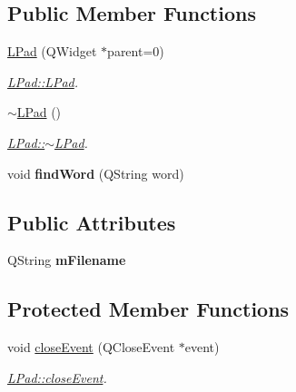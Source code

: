 \subsection*{Public Member Functions}
\begin{DoxyCompactItemize}
\item 
\hyperlink{class_l_pad_ae4d17da9ca09a5c0dbcebc20f1d981c9}{L\+Pad} (Q\+Widget $\ast$parent=0)
\begin{DoxyCompactList}\small\item\em \hyperlink{class_l_pad_ae4d17da9ca09a5c0dbcebc20f1d981c9}{L\+Pad\+::\+L\+Pad}. \end{DoxyCompactList}\item 
\hypertarget{class_l_pad_a3379f0db7845c9cebbab6b365d3b855f}{}\hyperlink{class_l_pad_a3379f0db7845c9cebbab6b365d3b855f}{$\sim$\+L\+Pad} ()\label{class_l_pad_a3379f0db7845c9cebbab6b365d3b855f}

\begin{DoxyCompactList}\small\item\em \hyperlink{class_l_pad_a3379f0db7845c9cebbab6b365d3b855f}{L\+Pad\+::$\sim$\+L\+Pad}. \end{DoxyCompactList}\item 
\hypertarget{class_l_pad_a702aadf33cff4f2ab7c6e9afe9ecd2cd}{}void {\bfseries find\+Word} (Q\+String word)\label{class_l_pad_a702aadf33cff4f2ab7c6e9afe9ecd2cd}

\end{DoxyCompactItemize}
\subsection*{Public Attributes}
\begin{DoxyCompactItemize}
\item 
\hypertarget{class_l_pad_a0c9ea7dd98b870c806ec09957b23c110}{}Q\+String {\bfseries m\+Filename}\label{class_l_pad_a0c9ea7dd98b870c806ec09957b23c110}

\end{DoxyCompactItemize}
\subsection*{Protected Member Functions}
\begin{DoxyCompactItemize}
\item 
void \hyperlink{class_l_pad_a3c1505476d5c4a12a5b9015c37c3afca}{close\+Event} (Q\+Close\+Event $\ast$event)
\begin{DoxyCompactList}\small\item\em \hyperlink{class_l_pad_a3c1505476d5c4a12a5b9015c37c3afca}{L\+Pad\+::close\+Event}. \end{DoxyCompactList}\end{DoxyCompactItemize}


